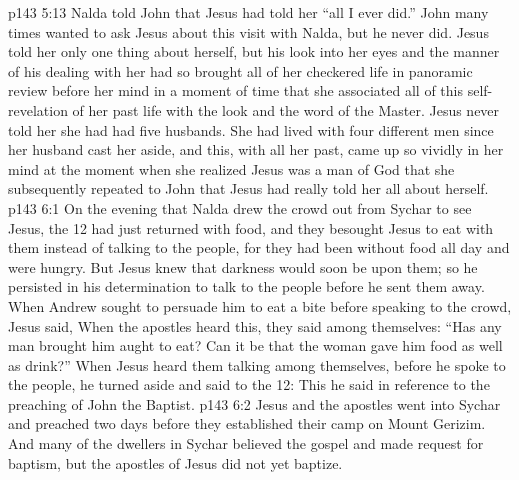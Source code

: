 \vs p143 5:13 Nalda told John that Jesus had told her “all I ever did.” John many times wanted to ask Jesus about this visit with Nalda, but he never did. Jesus told her only one thing about herself, but his look into her eyes and the manner of his dealing with her had so brought all of her checkered life in panoramic review before her mind in a moment of time that she associated all of this self\hyp{}revelation of her past life with the look and the word of the Master. Jesus never told her she had had five husbands. She had lived with four different men since her husband cast her aside, and this, with all her past, came up so vividly in her mind at the moment when she realized Jesus was a man of God that she subsequently repeated to John that Jesus had really told her all about herself.
\vs p143 6:1 On the evening that Nalda drew the crowd out from Sychar to see Jesus, the 12 had just returned with food, and they besought Jesus to eat with them instead of talking to the people, for they had been without food all day and were hungry. But Jesus knew that darkness would soon be upon them; so he persisted in his determination to talk to the people before he sent them away. When Andrew sought to persuade him to eat a bite before speaking to the crowd, Jesus said,  When the apostles heard this, they said among themselves: “Has any man brought him aught to eat? Can it be that the woman gave him food as well as drink?” When Jesus heard them talking among themselves, before he spoke to the people, he turned aside and said to the 12:  This he said in reference to the preaching of John the Baptist.
\vs p143 6:2 Jesus and the apostles went into Sychar and preached two days before they established their camp on Mount Gerizim. And many of the dwellers in Sychar believed the gospel and made request for baptism, but the apostles of Jesus did not yet baptize.
